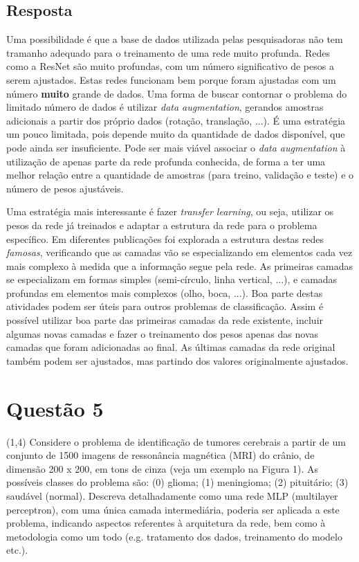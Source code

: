 \documentclass[final,3p]{elsarticle}
\numberwithin{equation}{section}
\begin{document}
    \subsection{Resposta}

        Uma possibilidade é que a base de dados utilizada pelas pesquisadoras não tem tramanho adequado para o treinamento de uma rede muito profunda. Redes como a ResNet são muito profundas, com um número significativo de pesos a serem ajustados. Estas redes funcionam bem porque foram ajustadas com um número \textbf{muito} grande de dados. Uma forma de buscar contornar o problema do limitado número de dados é utilizar \emph{data augmentation}, gerandos amostras adicionais a partir dos próprio dados (rotação, translação, ...). É uma estratégia um pouco limitada, pois depende muito da quantidade de dados disponível, que pode ainda ser insuficiente. Pode ser mais viável associar o \emph{data augmentation} à utilização de apenas parte da rede profunda conhecida, de forma a ter uma melhor relação entre a quantidade de amostras (para treino, validação e teste) e o número de pesos ajustáveis.

        Uma estratégia mais interessante é fazer \emph{transfer learning}, ou seja, utilizar os pesos da rede já treinados e adaptar a estrutura da rede para o problema específico. Em diferentes publicações foi explorada a estrutura destas redes \emph{famosas}, verificando que as camadas vão se especializando em elementos cada vez mais complexo à medida que a informação segue pela rede. As primeiras camadas se especializam em formas simples (semi-círculo, linha vertical, ...), e camadas profundas em elementos mais complexos (olho, boca, ...). Boa parte destas atividades podem ser úteis para outros problemas de classificação. Assim é possível utilizar boa parte das primeiras camadas da rede existente, incluir algumas novas camadas e fazer o treinamento dos pesos apenas das novas camadas que foram adicionadas ao final. As últimas camadas da rede original também podem ser ajustados, mas partindo dos valores originalmente ajustados.

\section{Questão 5}

    (1,4) Considere o problema de identificação de tumores cerebrais a partir de um conjunto de 1500 imagens de ressonância magnética (MRI) do crânio, de dimensão 200 x 200, em tons de cinza (veja um exemplo na Figura 1).
    As possíveis classes do problema são: (0) glioma; (1) meningioma; (2) pituitário; (3) saudável (normal). Descreva detalhadamente como uma rede MLP (multilayer perceptron), com uma única camada intermediária, poderia ser aplicada a este problema, indicando aspectos referentes à arquitetura da rede, bem como à metodologia como um todo (e.g. tratamento dos dados, treinamento do modelo etc.).
\end{document}
